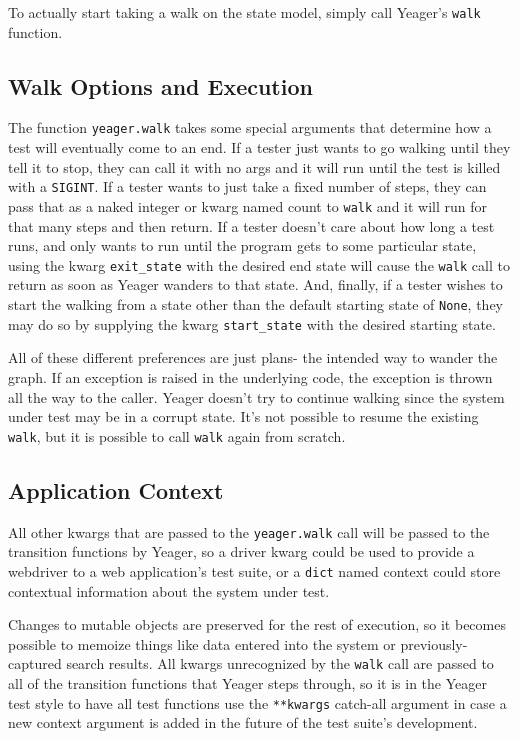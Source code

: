 To actually start taking a walk on the state model, simply call Yeager's \texttt{walk} function.

\subsection{Walk Options and Execution}
The function \texttt{yeager.walk} takes some special arguments that determine how a test will eventually come to an end. If a tester just wants to go walking until they tell it to stop, they can call it with no args and it will run until the test is killed with a \texttt{SIGINT}. If a tester wants to just take a fixed number of steps, they can pass that as a naked integer or kwarg named count to \texttt{walk} and it will run for that many steps and then return. If a tester doesn't care about how long a test runs, and only wants to run until the program gets to some particular state, using the kwarg \texttt{exit\_state} with the desired end state will cause the \texttt{walk} call to return as soon as Yeager wanders to that state. And, finally, if a tester wishes to start the walking from a state other than the default starting state of \texttt{None}, they may do so by supplying the kwarg \texttt{start\_state} with the desired starting state.

All of these different preferences are just plans- the intended way to wander the graph. If an exception is raised in the underlying code, the exception is thrown all the way to the caller. Yeager doesn't try to continue walking since the system under test may be in a corrupt state. It's not possible to resume the existing \texttt{walk}, but it is possible to call \texttt{walk} again from scratch.

\subsection{Application Context}
All other kwargs that are passed to the \texttt{yeager.walk} call will be passed to the transition functions by Yeager, so a driver kwarg could be used to provide a webdriver to a web application's test suite, or a \texttt{dict} named context could store contextual information about the system under test.

Changes to mutable objects are preserved for the rest of execution, so it becomes possible to memoize things like data entered into the system or previously-captured search results. All kwargs unrecognized by the \texttt{walk} call are passed to all of the transition functions that Yeager steps through, so it is in the Yeager test style to have all test functions use the \texttt{**kwargs} catch-all argument in case a new context argument is added in the future of the test suite's development.

